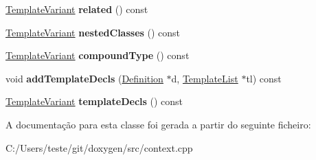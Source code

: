 \begin{DoxyCompactItemize}
\item 
\hypertarget{class_class_context_1_1_private_a4f1bfea8fd671f1a78ef1933c93bafc5}{\hyperlink{class_template_variant}{Template\-Variant} {\bfseries related} () const }\label{class_class_context_1_1_private_a4f1bfea8fd671f1a78ef1933c93bafc5}

\item 
\hypertarget{class_class_context_1_1_private_ae0f518b237686ecc479e1a0dc820a2a9}{\hyperlink{class_template_variant}{Template\-Variant} {\bfseries nested\-Classes} () const }\label{class_class_context_1_1_private_ae0f518b237686ecc479e1a0dc820a2a9}

\item 
\hypertarget{class_class_context_1_1_private_a5845bad3a54f7e382b0aa098a3c223c4}{\hyperlink{class_template_variant}{Template\-Variant} {\bfseries compound\-Type} () const }\label{class_class_context_1_1_private_a5845bad3a54f7e382b0aa098a3c223c4}

\item 
\hypertarget{class_class_context_1_1_private_ae04fc90990831027dc0c5e9edc98613d}{void {\bfseries add\-Template\-Decls} (\hyperlink{class_definition}{Definition} $\ast$d, \hyperlink{class_template_list}{Template\-List} $\ast$tl) const }\label{class_class_context_1_1_private_ae04fc90990831027dc0c5e9edc98613d}

\item 
\hypertarget{class_class_context_1_1_private_a9ddede0306eb772705b891f5b90b067b}{\hyperlink{class_template_variant}{Template\-Variant} {\bfseries template\-Decls} () const }\label{class_class_context_1_1_private_a9ddede0306eb772705b891f5b90b067b}

\end{DoxyCompactItemize}


A documentação para esta classe foi gerada a partir do seguinte ficheiro\-:\begin{DoxyCompactItemize}
\item 
C\-:/\-Users/teste/git/doxygen/src/context.\-cpp\end{DoxyCompactItemize}

